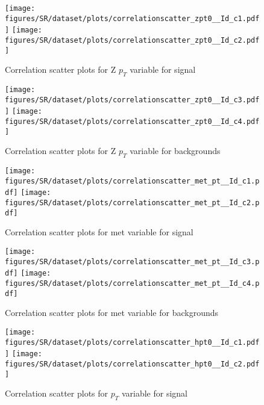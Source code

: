 \begin{figure}[!htb]%
\centering
\texttt{[image: figures/SR/dataset/plots/correlationscatter\_zpt0\_\_Id\_c1.pdf]}
\texttt{[image: figures/SR/dataset/plots/correlationscatter\_zpt0\_\_Id\_c2.pdf]}
\caption{ Correlation scatter plots for Z $p_{T}$  variable for signal}%
\label{fig:correlations_SR_zpt_S}                                                       
\end{figure}
\clearpage


\begin{figure}[!htb]%
\centering
\texttt{[image: figures/SR/dataset/plots/correlationscatter\_zpt0\_\_Id\_c3.pdf]}
\texttt{[image: figures/SR/dataset/plots/correlationscatter\_zpt0\_\_Id\_c4.pdf]}
\caption{ Correlation scatter plots for Z $p_{T}$ variable for backgrounds}%
\label{fig:correlations_SR_zpt_BG}                                                       
\end{figure}
\clearpage

\begin{figure}[!htb]%
\centering
\texttt{[image: figures/SR/dataset/plots/correlationscatter\_met\_pt\_\_Id\_c1.pdf]}
\texttt{[image: figures/SR/dataset/plots/correlationscatter\_met\_pt\_\_Id\_c2.pdf]}
\caption{ Correlation scatter plots for met variable for signal}%
\label{fig:correlations_SR_met_pt_S}                                                       
\end{figure}
\clearpage


\begin{figure}[!htb]%
\centering
\texttt{[image: figures/SR/dataset/plots/correlationscatter\_met\_pt\_\_Id\_c3.pdf]}
\texttt{[image: figures/SR/dataset/plots/correlationscatter\_met\_pt\_\_Id\_c4.pdf]}
\caption{ Correlation scatter plots for met variable for backgrounds}%
\label{fig:correlations_SR_met_pt_BG}                                                       
\end{figure}
\clearpage




\begin{figure}[!htb]%
\centering
\texttt{[image: figures/SR/dataset/plots/correlationscatter\_hpt0\_\_Id\_c1.pdf]}
\texttt{[image: figures/SR/dataset/plots/correlationscatter\_hpt0\_\_Id\_c2.pdf]}
\caption{ Correlation scatter plots for \HZZ $p_{T}$  variable for signal}%
\label{fig:correlations_SR_hpt0_S}                                                       
\end{figure}
\clearpage


